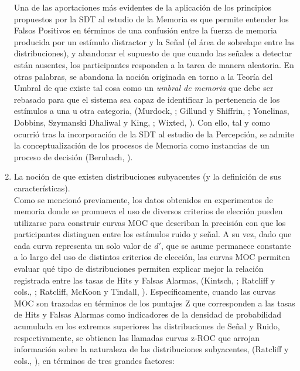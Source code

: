 \begin{enumerate}
Una de las aportaciones más evidentes de la aplicación de los principios propuestos por la SDT al estudio de la Memoria es que permite entender los Falsos Positivos en términos de una confusión entre la fuerza de memoria producida por un estímulo distractor y la Señal (el área de sobrelape entre las distribuciones), y abandonar el supuesto de que cuando las señales a detectar están ausentes, los participantes responden a la tarea de manera aleatoria. En otras palabras, se abandona la noción originada en torno a la Teoría del Umbral de que existe tal cosa como un \textit{umbral de memoria} que debe ser rebasado para que el sistema sea capaz de identificar la pertenencia de los estímulos a una u otra categoria, (Murdock, \citeyear{Murdock1982}; Gillund y Shiffrin, \citeyear{Gillund1984}; Yonelinas, Dobbins, Szymanski Dhaliwal y King, \citeyear{Yonelinas1996}; Wixted, \citeyear{Wixted2007}). Con ello, tal y como ocurrió tras la incorporación de la SDT al estudio de la Percepción, se admite la conceptualización de los procesos de Memoria como instancias de un proceso de decisión (Bernbach, \citeyear{Bernbach1967}).\\
 
\item La noción de que existen distribuciones subyacentes (y la definición de sus características).\\

Como se mencionó previamente, los datos obtenidos en experimentos de memoria donde se promueva el uso de diversos criterios de elección pueden utilizarse para construir curvas MOC que describan la precisión con que los participantes distinguen entre los estímulos ruido y señal. A su vez, dado que cada curva representa un solo valor de $d'$, que se asume permanece constante a lo largo del uso de distintos criterios de elección, las curvas MOC permiten evaluar qué tipo de distribuciones permiten explicar mejor la relación registrada entre las tasas de Hits y Falsas Alarmas, (Kintsch, \citeyear{Kintsch1967}; Ratcliff y cols., \citeyear{Ratcliff1992}; Ratcliff, McKoon y Tindall, \citeyear{Ratcliff1994}). Específicamente, cuando las curvas MOC son trazadas en términos de los puntajes Z que corresponden a las tasas de Hits y Falsas Alarmas como indicadores de la densidad de probabilidad acumulada en los extremos superiores las distribuciones de Señal y Ruido, respectivamente, se obtienen las llamadas curvas z-ROC que arrojan información sobre la naturaleza de las distribuciones subyacentes, (Ratcliff y cols., \citeyear{Ratcliff1992}), en términos de tres grandes factores:\\


\end{enumerate}

